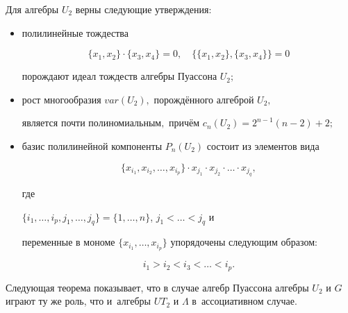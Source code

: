\begin{theorem}

Для алгебры $U_2$ верны следующие утверждения\/$:$



\begin{itemize}

\item[\rm (i)] полилинейные тождества

$$

 \{x_1,x_2\} \cdot \{x_3,x_4\}=0, \quad 

\{\{x_1,x_2\}, \{x_3,x_4\}\}=0

$$

порождают идеал тождеств алгебры Пуассона $U_2;$



\item[\rm (ii)] рост многообразия $var(U_2),$ порождённого алгеброй $U_2,$

является почти полиномиальным$,$ причём $c_n(U_2)=2^{n-1}(n-2)+2;$



\item[\rm (iii)] базис полилинейной компоненты $P_n(U_2)$ состоит из элементов вида

$$

 \{x_{i_1},x_{i_2}, \dots ,x_{i_p}\}\cdot x_{j_1}\cdot x_{j_2} \cdot \dots \cdot x_{j_q},

$$

 где

$\{i_1, \dots ,i_p,j_1, \dots ,j_q\}=\{1, \dots ,n\}$, $j_1< \dots <j_q$ и

переменные в мономе $\{x_{i_1}, \dots ,x_{i_p}\}$ упорядочены следующим образом\/$:$

$$

i_1> i_2<i_3< \dots <i_p.

$$





\end{itemize}



\end{theorem}



\smallskip



Следующая теорема показывает, что в случае алгебр Пуассона алгебры $U_2$ и $G$ играют ту же роль, что и~алгебры $UT_2$ и $\Lambda$ в~ассоциативном случае.



